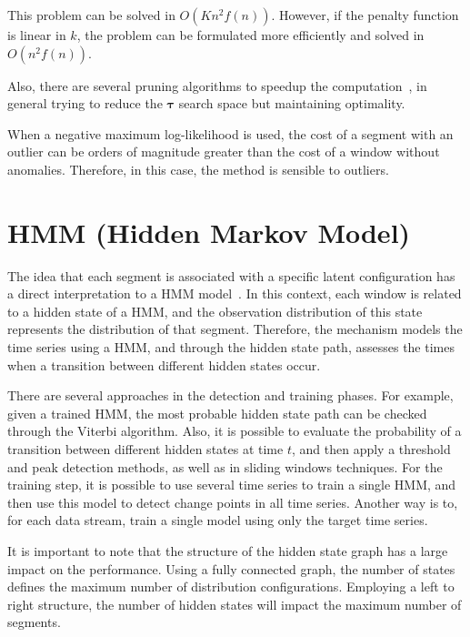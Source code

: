 This problem can be solved in $O(K n^{2} f(n))$. However, if the penalty
function is linear in $k$, the problem can be formulated more efficiently and
solved in $O(n^{2} f(n))$.

Also, there are several pruning algorithms to speedup the
computation~\cite{optimal_detection_of_changepoints_with_a_linear_computational_cost, on_optimal_multiple_changepoint_algorithms_for_large_data, computationally_efficient_changepoint_detection_for_a_range_of_penalties},
in general trying to reduce the $\boldsymbol \tau$ search space but maintaining
optimality.

When a negative maximum log-likelihood is
used, the cost of a segment with an outlier can be orders of magnitude greater
than the cost of a window without anomalies. Therefore,
in this case, the method is sensible to outliers.

\section{HMM (Hidden Markov Model)}

The idea that each segment is associated with a specific latent configuration
has a direct interpretation to a HMM
model~\cite{a_hidden_markov_model_segmentation_procedure_for_hydrological_and_environmental_time_series, fast_estimation_of_posterior_probabilities_in_change-point_analysis_through_a_constrained_hidden_markov_model, inertial_hidden_markov_models_modeling_change_in_multivariate_time_series}.
In this context, each window is related to a hidden state of a HMM, and the
observation distribution of this state represents the distribution of that
segment. Therefore, the mechanism models the time series using a HMM, and
through the hidden state path, assesses the times when a transition between
different hidden states occur.

There are several approaches in the detection and training phases. For example,
given a trained HMM, the most probable hidden state path can be checked through
the Viterbi algorithm. Also, it is possible to evaluate the probability of a
transition between different hidden states at time $t$, and then apply a
threshold and peak detection methods, as well as in sliding windows techniques.
For the training step, it is possible to use several time series to train a
single HMM, and then use this model to detect change points in all time series.
Another way is to, for each data stream, train a single model using only the
target time series.

It is important to note that the structure of the hidden state graph has a large
impact on the performance. Using a fully connected graph, the number of states
defines the maximum number of distribution configurations. Employing a left to
right structure, the number of hidden states will impact the maximum number of
segments.

